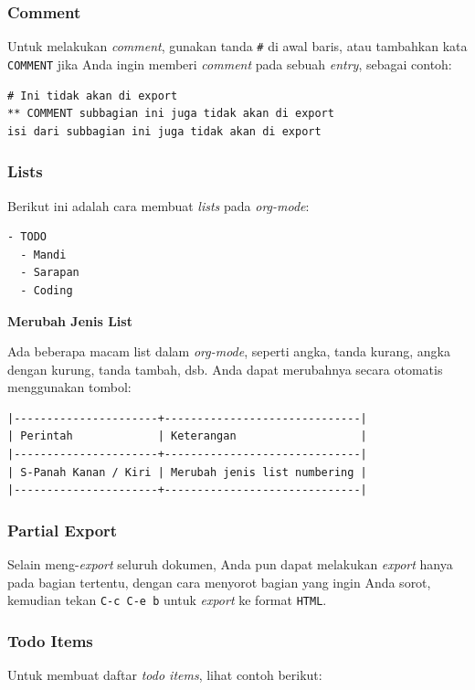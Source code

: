 \documentclass{article}
\begin{document}
\subsubsection{Comment}
Untuk melakukan \emph{comment}, gunakan tanda \verb=#= di awal baris, atau
tambahkan kata \verb=COMMENT= jika Anda ingin memberi \emph{comment} pada
sebuah \emph{entry}, sebagai contoh:

\begin{verbatim}
# Ini tidak akan di export
** COMMENT subbagian ini juga tidak akan di export
isi dari subbagian ini juga tidak akan di export
\end{verbatim}

\subsubsection{Lists}
Berikut ini adalah cara membuat \emph{lists} pada \emph{org-mode}:

\begin{verbatim}
- TODO
  - Mandi
  - Sarapan
  - Coding
\end{verbatim}

\noindent\textbf{Merubah Jenis List}

Ada beberapa macam list dalam \emph{org-mode}, seperti angka, tanda kurang,
angka dengan kurung, tanda tambah, dsb. Anda dapat merubahnya secara 
otomatis menggunakan tombol:

\begin{verbatim}
|----------------------+------------------------------|
| Perintah             | Keterangan                   |
|----------------------+------------------------------|
| S-Panah Kanan / Kiri | Merubah jenis list numbering |
|----------------------+------------------------------|
\end{verbatim}

\subsubsection{Partial Export}
Selain meng-\emph{export} seluruh dokumen, Anda pun dapat melakukan 
\emph{export} hanya pada bagian tertentu, dengan cara menyorot bagian yang 
ingin Anda sorot, kemudian tekan \verb=C-c C-e b= untuk \emph{export} ke 
format \verb=HTML=.

\subsubsection{Todo Items}
Untuk membuat daftar \emph{todo items}, lihat contoh berikut:
\end{document}
